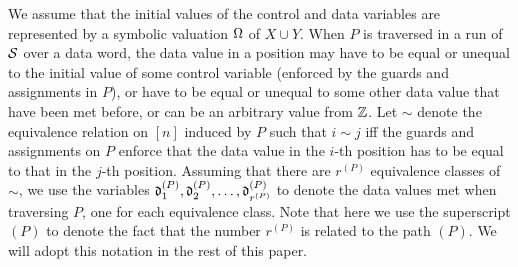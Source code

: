 We assume that the initial values of the control and data variables are represented by a symbolic valuation $\Omega$ of $X \cup Y$. When $P$ is traversed in a run of ${\mathcal{S} }$ over a data word,  the data value in a position may have to be equal or unequal to the initial value of some control variable (enforced by the guards and assignments in $P$), or have to be equal or unequal to some other data value that have been met before, or can be an arbitrary value from ${\mathbb{Z} }$. Let $\sim$  denote the equivalence relation on $[n]$ induced by $P$ such that $i \sim j$ iff the guards and assignments on $P$ enforce that the data value in the $i$-th position has to be equal to that in the $j$-th position. Assuming that there are $r^{(P)}$ equivalence classes of $\sim$, we use the variables $\mathfrak{d}^{(P)}_1,\mathfrak{d}^{(P)}_2,\dots, \mathfrak{d}^{(P)}_{r^{(P)}}$ to denote the data values met when traversing $P$, one for each equivalence class. Note that here we use the superscript ${(P)}$ to denote the fact that the number $r^{(P)}$ is related to the path $(P)$. We will adopt this notation in the rest of this paper.


